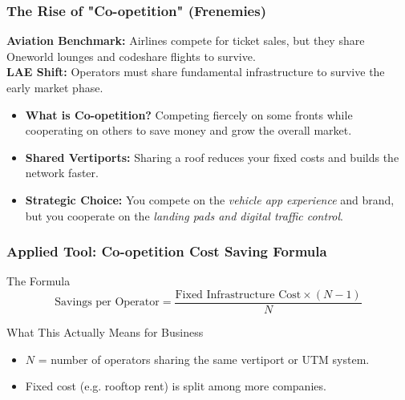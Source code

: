 \documentclass{beamer}
\begin{document}








\begin{frame}[t]
  \frametitle{The Rise of "Co-opetition" (Frenemies)}

  \textbf{Aviation Benchmark:} Airlines compete for ticket sales, but they share Oneworld lounges and codeshare flights to survive. \\
  \textbf{LAE Shift:} Operators must share fundamental infrastructure to survive the early market phase.

  \begin{itemize}
    \item \textbf{What is Co-opetition?} Competing fiercely on some fronts while cooperating on others to save money and grow the overall market.
    \item \textbf{Shared Vertiports:} Sharing a roof reduces your fixed costs and builds the network faster.
    \item \textbf{Strategic Choice:} You compete on the \textit{vehicle app experience} and brand, but you cooperate on the \textit{landing pads and digital traffic control}.
  \end{itemize}
\end{frame}


\begin{frame}[t, shrink=10]
  \frametitle{Applied Tool: Co-opetition Cost Saving Formula}
 
  \begin{block}{The Formula}
  \begin{equation}
      \text{Savings per Operator} = \frac{\text{Fixed Infrastructure Cost} \times (N-1)}{N}
  \end{equation}
  \end{block}
 
  \vspace{0.1cm}
  \begin{block}{What This Actually Means for Business}
  \begin{itemize}
    \item $N$ = number of operators sharing the same vertiport or UTM system.
    \item Fixed cost (e.g. rooftop rent) is split among more companies.
  \end{itemize}
  \end{block}
\end{frame}
\end{document}
